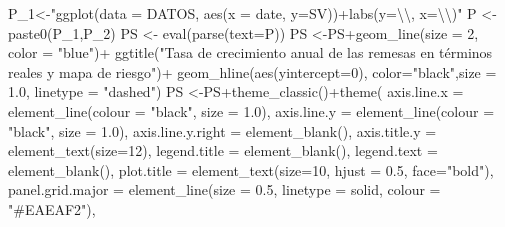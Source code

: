 \documentclass[
]{book}
\newenvironment{Shaded}{\begin{snugshade}}{\end{snugshade}}
\newcommand{\AttributeTok}[1]{\textcolor[rgb]{0.77,0.63,0.00}{#1}}
\newcommand{\DecValTok}[1]{\textcolor[rgb]{0.00,0.00,0.81}{#1}}
\newcommand{\FloatTok}[1]{\textcolor[rgb]{0.00,0.00,0.81}{#1}}
\newcommand{\FunctionTok}[1]{\textcolor[rgb]{0.00,0.00,0.00}{#1}}
\newcommand{\NormalTok}[1]{#1}
\newcommand{\OtherTok}[1]{\textcolor[rgb]{0.56,0.35,0.01}{#1}}
\newcommand{\SpecialCharTok}[1]{\textcolor[rgb]{0.00,0.00,0.00}{#1}}
\newcommand{\StringTok}[1]{\textcolor[rgb]{0.31,0.60,0.02}{#1}}
\begin{document}
\begin{Shaded}
\begin{Highlighting}[]
\NormalTok{P\_1}\OtherTok{\textless{}{-}}\StringTok{"ggplot(data = DATOS, aes(x = date, y=SV))+labs(y=}\SpecialCharTok{\textbackslash{}\textquotesingle{}\textbackslash{}\textquotesingle{}}\StringTok{, x=}\SpecialCharTok{\textbackslash{}\textquotesingle{}\textbackslash{}\textquotesingle{}}\StringTok{)"}
\NormalTok{P  }\OtherTok{\textless{}{-}}\FunctionTok{paste0}\NormalTok{(P\_1,P\_2)}
\NormalTok{PS }\OtherTok{\textless{}{-}} \FunctionTok{eval}\NormalTok{(}\FunctionTok{parse}\NormalTok{(}\AttributeTok{text=}\NormalTok{P))}
\NormalTok{PS }\OtherTok{\textless{}{-}}\NormalTok{PS}\SpecialCharTok{+}\FunctionTok{geom\_line}\NormalTok{(}\AttributeTok{size =} \DecValTok{2}\NormalTok{, }\AttributeTok{color =} \StringTok{"blue"}\NormalTok{)}\SpecialCharTok{+}
  \FunctionTok{ggtitle}\NormalTok{(}\StringTok{"Tasa de crecimiento anual de las remesas en términos reales y mapa de riesgo"}\NormalTok{)}\SpecialCharTok{+}
  \FunctionTok{geom\_hline}\NormalTok{(}\FunctionTok{aes}\NormalTok{(}\AttributeTok{yintercept=}\DecValTok{0}\NormalTok{), }\AttributeTok{color=}\StringTok{"black"}\NormalTok{,}\AttributeTok{size =} \FloatTok{1.0}\NormalTok{, }\AttributeTok{linetype =} \StringTok{"dashed"}\NormalTok{)}
\NormalTok{PS }\OtherTok{\textless{}{-}}\NormalTok{PS}\SpecialCharTok{+}\FunctionTok{theme\_classic}\NormalTok{()}\SpecialCharTok{+}\FunctionTok{theme}\NormalTok{(}
  \AttributeTok{axis.line.x =} \FunctionTok{element\_line}\NormalTok{(}\AttributeTok{colour =} \StringTok{"black"}\NormalTok{, }\AttributeTok{size =} \FloatTok{1.0}\NormalTok{),}
  \AttributeTok{axis.line.y =} \FunctionTok{element\_line}\NormalTok{(}\AttributeTok{colour =} \StringTok{"black"}\NormalTok{, }\AttributeTok{size =} \FloatTok{1.0}\NormalTok{),}
  \AttributeTok{axis.line.y.right =} \FunctionTok{element\_blank}\NormalTok{(),}
  \AttributeTok{axis.title.y =} \FunctionTok{element\_text}\NormalTok{(}\AttributeTok{size=}\DecValTok{12}\NormalTok{),}
  \AttributeTok{legend.title =} \FunctionTok{element\_blank}\NormalTok{(),}
  \AttributeTok{legend.text  =} \FunctionTok{element\_blank}\NormalTok{(),}
  \AttributeTok{plot.title   =} \FunctionTok{element\_text}\NormalTok{(}\AttributeTok{size=}\DecValTok{10}\NormalTok{, }\AttributeTok{hjust =} \FloatTok{0.5}\NormalTok{, }\AttributeTok{face=}\StringTok{"bold"}\NormalTok{),}
  \AttributeTok{panel.grid.major =} \FunctionTok{element\_line}\NormalTok{(}\AttributeTok{size =} \FloatTok{0.5}\NormalTok{,}
                                  \AttributeTok{linetype =} \StringTok{\textquotesingle{}solid\textquotesingle{}}\NormalTok{, }\AttributeTok{colour =} \StringTok{"\#EAEAF2"}\NormalTok{),}

\end{Highlighting}
\end{Shaded}
\end{document}
